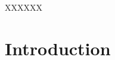 \documentclass[preprint,12pt]{elsarticle}
\begin{document}
\begin{frontmatter}

\begin{abstract}


\end{abstract}

\begin{keyword}
XXXXXX
\end{keyword}

\end{frontmatter}




\section{Introduction}
\label{sec:introduction}







%







\end{document}
